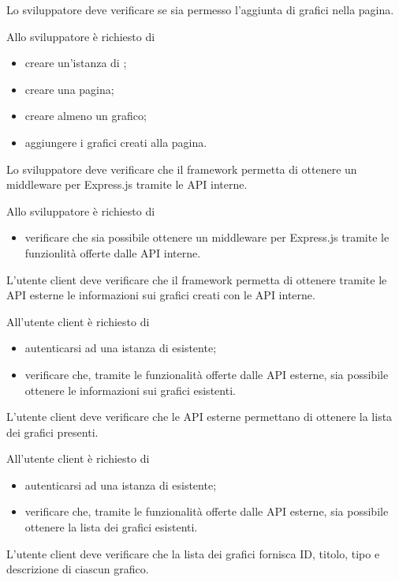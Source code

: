 	Lo sviluppatore deve verificare se sia permesso l'aggiunta di grafici nella pagina.
		
		Allo sviluppatore è richiesto di
		\begin{itemize}
			\item creare un'istanza di \projectname{};
			\item creare una pagina;
			\item creare almeno un grafico;
			\item aggiungere i grafici creati alla pagina.
		\end{itemize}

	Lo sviluppatore deve verificare che il framework permetta di ottenere un middleware per Express.js tramite le API interne.
		
		Allo sviluppatore è richiesto di
		\begin{itemize}
			\item verificare che sia possibile ottenere un middleware per Express.js tramite le funzionlità offerte dalle API interne.
		\end{itemize}

	L'utente client deve verificare che il framework permetta di ottenere tramite le API esterne le informazioni sui grafici creati con le API interne.

		All'utente client è richiesto di
		\begin{itemize}
			\item autenticarsi ad una istanza di \projectname{} esistente;
			\item verificare che, tramite le funzionalità offerte dalle API esterne, sia possibile ottenere le informazioni sui grafici esistenti.
		\end{itemize}

	L'utente client deve verificare che le API esterne permettano di ottenere la lista dei grafici presenti.

		All'utente client è richiesto di
		\begin{itemize}
			\item autenticarsi ad una istanza di \projectname{} esistente;
			\item verificare che, tramite le funzionalità offerte dalle API esterne, sia possibile ottenere la lista dei grafici esistenti.
		\end{itemize}

	L'utente client deve verificare che la lista dei grafici fornisca ID, titolo, tipo e descrizione di ciascun grafico.
		
